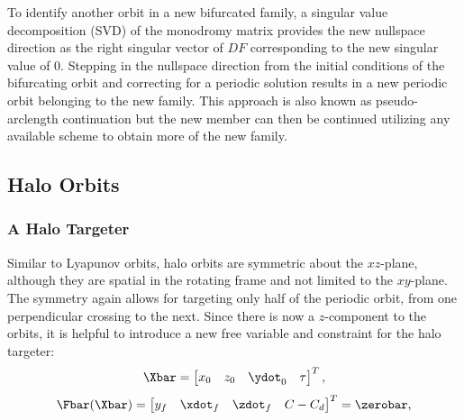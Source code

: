 To identify another orbit in a new bifurcated family, a singular value decomposition (SVD) of the
monodromy matrix provides the new nullspace direction as the right singular vector of $DF$
corresponding to the new singular value of $0$. Stepping in the nullspace direction from the
initial conditions of the bifurcating orbit and correcting for a periodic solution results in a new
periodic orbit belonging to the new family. This approach is also known as pseudo-arclength
continuation but the new member can then be continued utilizing any available scheme to obtain more
of the new family.

\subsection{Halo Orbits}
\subsubsection{A Halo Targeter}
Similar to Lyapunov orbits, halo orbits are symmetric about the $xz$-plane, although they are
spatial in the rotating frame and not limited to the $xy$-plane. The symmetry again allows for
targeting only half of the periodic orbit, from one perpendicular crossing to the next. Since there
is now a $z$-component to the orbits, it is helpful to introduce a new free variable and constraint
for the halo targeter:
\begin{equation}
    \Xbar=\begin{bmatrix}   x_{0}   &   z_{0}   &   \ydot_{0}   &   \tau    \end{bmatrix}^{T},
    \label{eq:halofreevar}
\end{equation}
\begin{equation}
    \Fbar(\Xbar)=\begin{bmatrix}    y_{f}   &   \xdot_{f}   &   \zdot_{f}   &   C-C_{d} \end{bmatrix}^{T}=\zerobar,
    \label{eq:haloconst}
\end{equation}
\vspace{1mm}
